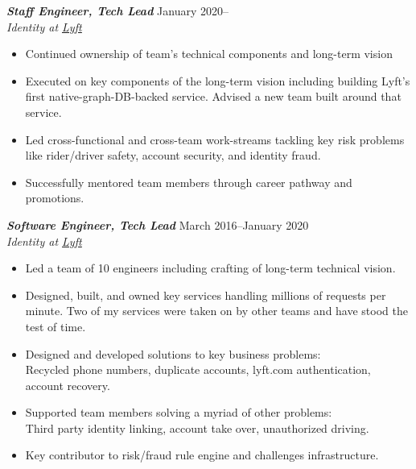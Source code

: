 \documentclass[line,letterpaper]{resume}
\begin{document}
\begin{resume}
    {\sl\textbf{Staff Engineer, Tech Lead}} \hfill January 2020--\\
    \emph{Identity at \underline{\href{https://www.lyft.com/}{Lyft}}}
    \begin{itemize}
        \item Continued ownership of team's technical components and long-term
            vision
        \item Executed on key components of the long-term vision including
            building Lyft's first native-graph-DB-backed service. Advised a new
            team built around that service.
        \item Led cross-functional and cross-team work-streams tackling key
            risk problems like rider/driver safety, account security, and
            identity fraud.
        \item Successfully mentored team members through career pathway and
            promotions.
    \end{itemize}
    \vspace{6pt}

    {\sl\textbf{Software Engineer, Tech Lead}} \hfill March 2016--January 2020\\
    \emph{Identity at \underline{\href{https://www.lyft.com/}{Lyft}}}
    \begin{itemize}
        \item Led a team of 10 engineers including crafting of long-term
            technical vision.
        \item Designed, built, and owned key services handling millions of
            requests per minute. Two of my services were taken on by other teams
            and have stood the test of time.
        \item Designed and developed solutions to key business problems: \\
            Recycled phone numbers, duplicate accounts, lyft.com authentication,
            account recovery.
        \item Supported team members solving a myriad of other problems: \\
            Third party identity linking, account take over, unauthorized
            driving.
        \item Key contributor to risk/fraud rule engine and challenges
            infrastructure.
    \end{itemize}
    \vspace{6pt}


\end{resume}
\end{document}
